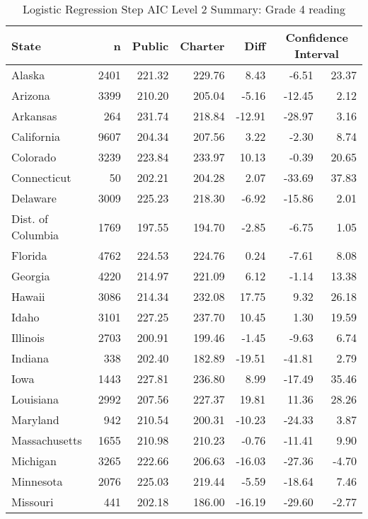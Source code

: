 \begin{table}[ht]
\begin{center}
\caption{Logistic Regression Step AIC Level 2 Summary: Grade 4 reading}
\label{g4readinglraiclevel2}
\begin{tabular}{lrrrrrr}
  \hline
  State & n & Public & Charter & Diff & \multicolumn{2}{c}{Confidence Interval} \\ \hline
Alaska & 2401 & 221.32 & 229.76 & 8.43 & -6.51 & 23.37 \\ 
  Arizona & 3399 & 210.20 & 205.04 & -5.16 & -12.45 & 2.12 \\ 
  Arkansas & 264 & 231.74 & 218.84 & -12.91 & -28.97 & 3.16 \\ 
  California & 9607 & 204.34 & 207.56 & 3.22 & -2.30 & 8.74 \\ 
  Colorado & 3239 & 223.84 & 233.97 & 10.13 & -0.39 & 20.65 \\ 
  Connecticut &  50 & 202.21 & 204.28 & 2.07 & -33.69 & 37.83 \\ 
  Delaware & 3009 & 225.23 & 218.30 & -6.92 & -15.86 & 2.01 \\ 
  Dist. of Columbia & 1769 & 197.55 & 194.70 & -2.85 & -6.75 & 1.05 \\ 
  Florida & 4762 & 224.53 & 224.76 & 0.24 & -7.61 & 8.08 \\ 
  Georgia & 4220 & 214.97 & 221.09 & 6.12 & -1.14 & 13.38 \\ 
  Hawaii & 3086 & 214.34 & 232.08 & 17.75 & 9.32 & 26.18 \\ 
  Idaho & 3101 & 227.25 & 237.70 & 10.45 & 1.30 & 19.59 \\ 
  Illinois & 2703 & 200.91 & 199.46 & -1.45 & -9.63 & 6.74 \\ 
  Indiana & 338 & 202.40 & 182.89 & -19.51 & -41.81 & 2.79 \\ 
  Iowa & 1443 & 227.81 & 236.80 & 8.99 & -17.49 & 35.46 \\ 
  Louisiana & 2992 & 207.56 & 227.37 & 19.81 & 11.36 & 28.26 \\ 
  Maryland & 942 & 210.54 & 200.31 & -10.23 & -24.33 & 3.87 \\ 
  Massachusetts & 1655 & 210.98 & 210.23 & -0.76 & -11.41 & 9.90 \\ 
  Michigan & 3265 & 222.66 & 206.63 & -16.03 & -27.36 & -4.70 \\ 
  Minnesota & 2076 & 225.03 & 219.44 & -5.59 & -18.64 & 7.46 \\ 
  Missouri & 441 & 202.18 & 186.00 & -16.19 & -29.60 & -2.77 \\ 

\end{tabular}
\end{center}
\end{table}
